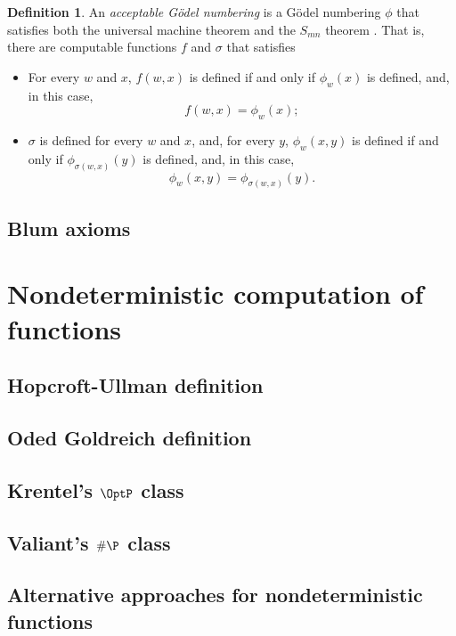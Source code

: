 \documentclass[12pt]{article}
\theoremstyle{definition}
\newtheorem{definition}{Definition}
\begin{document}
\begin{definition}
    An \emph{acceptable Gödel numbering}
    is a Gödel numbering $\phi$
    that satisfies both the universal machine theorem
    and the $S_{mn}$ theorem \cite[p.~41]{Rogers1987}.
    That is, there are computable functions $f$ and $\sigma$
    that satisfies
    \begin{itemize}
        \item For every $w$ and $x$,
            $f(w, x)$ is defined if and only if $\phi_w(x)$ is defined,
            and, in this case,
            \begin{equation*}
                f(w, x) = \phi_w(x);
            \end{equation*}
        \item $\sigma$ is defined for every $w$ and $x$,
            and, for every $y$,
            $\phi_w(x, y)$ is defined if and only if $\phi_{\sigma(w, x)}(y)$ is defined,
            and, in this case,
            \begin{equation*}
                \phi_w(x, y) = \phi_{\sigma(w, x)}(y).
            \end{equation*}
    \end{itemize}
\end{definition}

\subsection{Blum axioms}
\label{sec:blum-axioms}

\section{Nondeterministic computation of functions}

\subsection{Hopcroft-Ullman definition}
\subsection{Oded Goldreich definition}
\subsection{Krentel's $\OptP$ class}
\subsection{Valiant's $\#\P$ class}
\subsection{Alternative approaches for nondeterministic functions}



\end{document}
